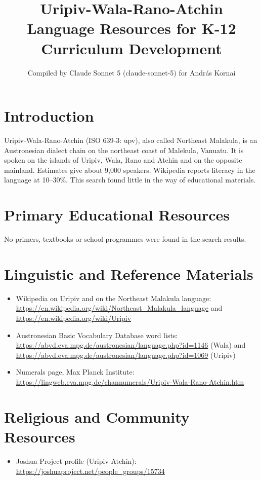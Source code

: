 \documentclass[12pt]{article}
\title{Uripiv-Wala-Rano-Atchin Language Resources for K-12 Curriculum Development}
\author{Compiled by Claude Sonnet 5 (claude-sonnet-5) for Andr\'as Kornai}
\date{}
\begin{document}
\maketitle

\section{Introduction}
Uripiv-Wala-Rano-Atchin (ISO 639-3: upv), also called Northeast Malakula, is an Austronesian dialect chain on the northeast coast of Malekula, Vanuatu. It is spoken on the islands of Uripiv, Wala, Rano and Atchin and on the opposite mainland. Estimates give about 9,000 speakers. Wikipedia reports literacy in the language at 10--30\%. This search found little in the way of educational materials.

\section{Primary Educational Resources}
No primers, textbooks or school programmes were found in the search results.

\section{Linguistic and Reference Materials}
\begin{itemize}
\item Wikipedia on Uripiv and on the Northeast Malakula language: \url{https://en.wikipedia.org/wiki/Northeast_Malakula_language} and \url{https://en.wikipedia.org/wiki/Uripiv}
\item Austronesian Basic Vocabulary Database word lists: \url{https://abvd.eva.mpg.de/austronesian/language.php?id=1146} (Wala) and \url{https://abvd.eva.mpg.de/austronesian/language.php?id=1069} (Uripiv)
\item Numerals page, Max Planck Institute: \url{https://lingweb.eva.mpg.de/channumerals/Uripiv-Wala-Rano-Atchin.htm}
\end{itemize}

\section{Religious and Community Resources}
\begin{itemize}
\item Joshua Project profile (Uripiv-Atchin): \url{https://joshuaproject.net/people_groups/15734}
\end{itemize}
\end{document}
